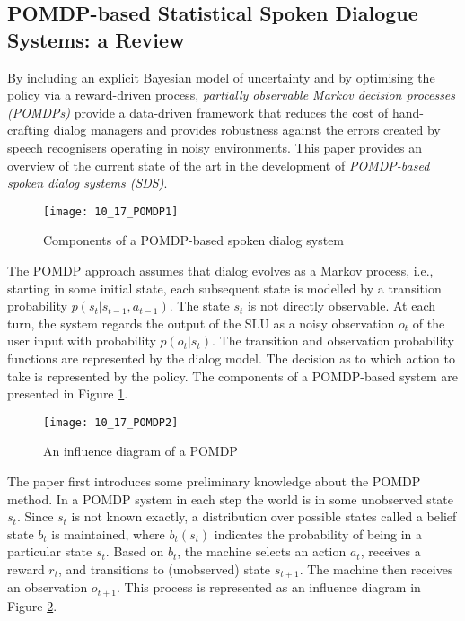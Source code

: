 \subsection{POMDP-based Statistical Spoken Dialogue Systems: a Review \cite{Young2013Pomdp}}

By including an explicit Bayesian model of uncertainty and by optimising the policy via a reward-driven process, \emph{partially observable Markov decision processes (POMDPs)} provide a data-driven framework that reduces the cost of hand-crafting dialog managers and provides robustness against the errors created by speech recognisers operating in noisy environments. This paper provides an overview of the current state of the art in the development of \emph{POMDP-based spoken dialog systems (SDS)}.

\begin{figure}[htbp]
  \centering
  \texttt{[image: 10\_17\_POMDP1]}\\
  \caption{Components of a POMDP-based spoken dialog system}\label{fig:POMDP1}
\end{figure}

The POMDP approach assumes that dialog evolves as a Markov process, i.e., starting in some initial state, each subsequent state is modelled by a transition probability $p(s_t | s_{t-1}, a_{t-1})$. The state $s_t$ is not directly observable. At each turn, the system regards the output of the SLU as a noisy observation $o_t$ of the user input with probability $p(o_t | s_t)$. The transition and observation probability functions are represented by the dialog model. The decision as to which action to take is represented by the policy. The components of a POMDP-based system are presented in Figure \ref{fig:POMDP1}.

\begin{figure}[htbp]
  \centering
  \texttt{[image: 10\_17\_POMDP2]}\\
  \caption{An influence diagram of a POMDP}\label{fig:POMDP2}
\end{figure}

The paper first introduces some preliminary knowledge about the POMDP method. In a POMDP system in each step the world is in some unobserved state $s_t$. Since $s_t$ is not known exactly, a distribution over possible states called a belief state $b_t$ is maintained, where $b_t(s_t)$ indicates the probability of being in a particular state $s_t$. Based on $b_t$, the machine selects an action $a_t$, receives a reward $r_t$, and transitions to (unobserved) state $s_{t+1}$. The machine then receives an observation $o_{t+1}$. This process is represented as an influence diagram in Figure \ref{fig:POMDP2}.

